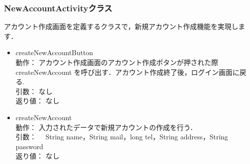 \documentclass[a4j,titlepage]{jarticle}
\begin{document}
\subsubsection{NewAccountActivityクラス}
アカウント作成画面を定義するクラスで，新規アカウント作成機能を実現します．
\begin{itemize}
  \item createNewAccountButton\\
動作： アカウント作成画面のアカウント作成ボタンが押された際 createNewAccount を呼び出す．アカウント作成終了後，ログイン画面に戻る.\\
  引数： なし\\
  返り値： なし

 \item createNewAccount\\
  動作：  入力されたデータで新規アカウントの作成を行う．\\
  引数： 　String name，String mail，long tel，String address，String password\\
  返り値： なし
\end{itemize}
\end{document}
